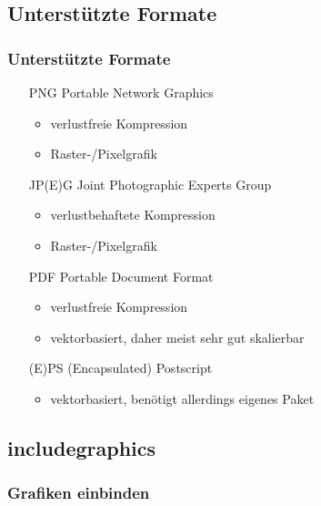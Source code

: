 \documentclass{beamer}
\begin{document}
\subsection{Unterstützte Formate}
\begin{frame}
\frametitle{Unterstützte Formate}
  \begin{itemize}
    \item[PNG] Portable Network Graphics
    \begin{itemize}
      \item verlustfreie Kompression
      \item Raster-/Pixelgrafik
    \end{itemize}
    \item[JP(E)G] Joint Photographic Experts Group
    \begin{itemize}
      \item verlustbehaftete Kompression
      \item Raster-/Pixelgrafik
    \end{itemize}
    \item[PDF] Portable Document Format
    \begin{itemize}
      \item verlustfreie Kompression
      \item vektorbasiert, daher meist sehr gut skalierbar
    \end{itemize}
    \item[(E)PS] (Encapsulated) Postscript
    \begin{itemize}
      \item vektorbasiert, benötigt allerdings eigenes Paket
    \end{itemize}
  \end{itemize}
\end{frame}

\subsection{includegraphics}
\begin{frame}[fragile]
\frametitle{Grafiken einbinden}
  \begin{semiverbatim}
  \end{semiverbatim}
\end{frame}
\end{document}
